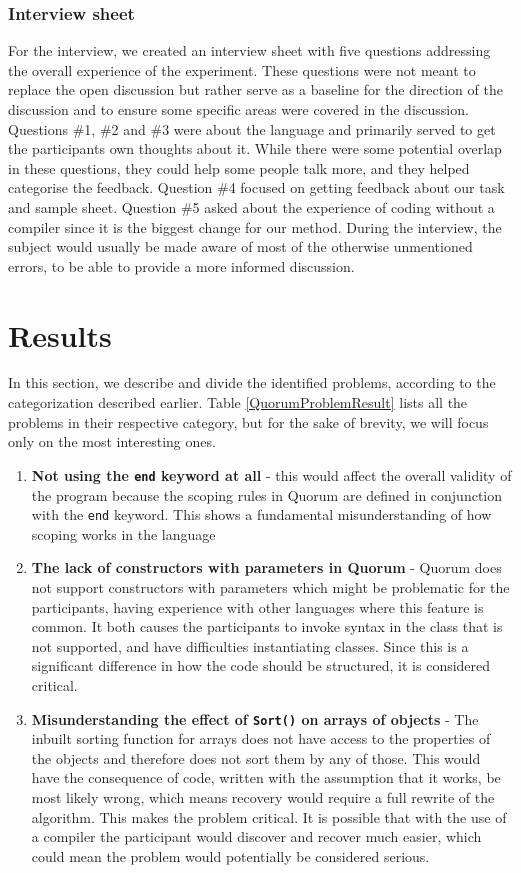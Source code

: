\documentclass[preprint,10pt]{sigplanconf}
\begin{document}
\subsubsection{Interview sheet}
For the interview, we created an interview sheet with five questions addressing the overall experience of the experiment.
These questions were not meant to replace the open discussion but rather serve as a baseline for the direction of the discussion and to ensure some specific areas were covered in the discussion.
Questions \#1, \#2 and \#3 were about the language and primarily served to get the participants own thoughts about it.
While there were some potential overlap in these questions, they could help some people talk more, and they helped categorise the feedback.
Question \#4 focused on getting feedback about our task and sample sheet.
Question \#5 asked about the experience of coding without a compiler since it is the biggest change for our method.
During the interview, the subject would usually be made aware of most of the otherwise unmentioned errors, to be able to provide a more informed discussion.

\section{Results}
In this section, we describe and divide the identified problems, according to the categorization described earlier. Table \ref{QuorumProblemResult} lists all the problems in their respective category, but for the sake of brevity, we will focus only on the most interesting ones. 

\begin{enumerate}
\item \textbf{Not using the \lstinline!end! keyword at all} - this would affect the overall validity of the program because the scoping rules in Quorum are defined in conjunction with the \lstinline!end! keyword. This shows a fundamental misunderstanding of how scoping works in the language
\item \textbf{The lack of constructors with parameters in Quorum} - Quorum does not support constructors with parameters which might be problematic for the participants, having experience with other languages where this feature is common. It both causes the participants to invoke syntax in the class that is not supported, and have difficulties instantiating classes. Since this is a significant difference in how the code should be structured, it is considered critical.
\item \textbf{Misunderstanding the effect of \lstinline!Sort()! on arrays of objects} - The inbuilt sorting function for arrays does not have access to the properties of the objects and therefore does not sort them by any of those. This would have the consequence of code, written with the assumption that it works, be most likely wrong, which means recovery would require a full rewrite of the algorithm. This makes the problem critical. It is possible that with the use of a compiler the participant would discover and recover much easier, which could mean the problem would potentially be considered serious.
\end{enumerate}
\end{document}
